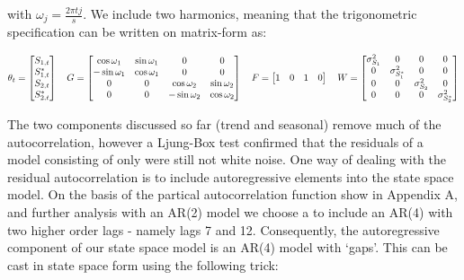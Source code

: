 \documentclass[]{article}
\begin{document}
with \(\omega_{j} = \frac{2 \pi t j}{s}\). We include two harmonics,
meaning that the trigonometric specification can be written on
matrix-form as:

\[
\theta_{t} = \begin{bmatrix} S_{1, t} \\ S_{1, t}^{*} \\ S_{2, t} \\ S_{2, t}^{*} \end{bmatrix} \quad
G = \begin{bmatrix} \cos \omega_{1} & \sin \omega_{1} & 0 & 0 \\ -\sin \omega_{1} & \cos \omega_{1} & 0 & 0 \\ 0 & 0 & \cos \omega_{2} & \sin \omega_{2} \\ 0 & 0 & -\sin \omega_{2} & \cos \omega_{2} \\ \end{bmatrix} \quad
F = \begin{bmatrix} 1 & 0 & 1 & 0\end{bmatrix} \\ \quad
W = \begin{bmatrix} \sigma_{S_{1}}^{2} & 0 & 0 & 0 \\ 0 & \sigma_{S_{1}^{*}}^{2} & 0 & 0 \\ 0 & 0 & \sigma_{S_{2}}^{2} & 0  \\ 0 & 0 & 0 & \sigma_{S_{2}^{*}}^{2} \end{bmatrix}
\]

The two components discussed so far (trend and seasonal) remove much of
the autocorrelation, however a Ljung-Box test confirmed that the
residuals of a model consisting of only were still not white noise. One
way of dealing with the residual autocorrelation is to include
autoregressive elements into the state space model. On the basis of the
partical autocorrelation function show in Appendix A, and further
analysis with an AR(2) model we choose a to include an AR(4) with two
higher order lags - namely lags 7 and 12. Consequently, the
autoregressive component of our state space model is an AR(4) model with
`gaps'. This can be cast in state space form using the following trick:
\end{document}
